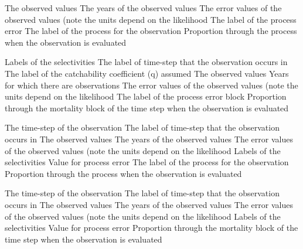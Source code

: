  {The observed values}
 {The years of the observed values}
 {The error values of the observed values (note the units depend on the likelihood}
 {The label of the process error}
 {The label of the process for the observation}
 {Proportion through the process when the observation is evaluated}
\par\textbf{}\par
{} {Labels of the selectivities}
 {The label of time-step that the observation occurs in}
 {The label of the catchability coefficient (q) assumed}
 {The observed values}
 {Years for which there are observations}
 {The error values of the observed values (note the units depend on the likelihood}
 {The label of the process error block}
 {Proportion through the mortality block of the time step when the observation is evaluated}
\par\textbf{}\par
{} {The time-step of the observation}
 {The label of time-step that the observation occurs in}
 {The observed values}
 {The years of the observed values}
 {The error values of the observed values (note the units depend on the likelihood}
 {Labels of the selectivities}
 {Value for process error}
 {The label of the process for the observation}
 {Proportion through the process when the observation is evaluated}
\par\textbf{}\par
{} {The time-step of the observation}
 {The label of time-step that the observation occurs in}
 {The observed values}
 {The years of the observed values}
 {The error values of the observed values (note the units depend on the likelihood}
 {Labels of the selectivities}
 {Value for process error}
 {Proportion through the mortality block of the time step when the observation is evaluated}
\par\textbf{}\par
